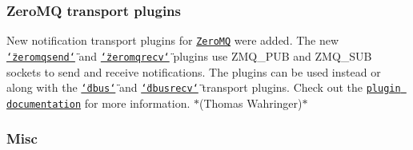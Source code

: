 \subsubsection*{Zero\+MQ transport plugins}


\begin{DoxyItemize}
\item New notification transport plugins for \href{http://zeromq.org/}{\tt Zero\+MQ} were added. The new \href{https://www.libelektra.org/plugins/zeromqsend}{\tt \char`\"{}zeromqsend\char`\"{}} and \href{https://www.libelektra.org/plugins/zeromqrecv}{\tt \char`\"{}zeromqrecv\char`\"{}} plugins use {\ttfamily Z\+M\+Q\+\_\+\+P\+UB} and {\ttfamily Z\+M\+Q\+\_\+\+S\+UB} sockets to send and receive notifications. The plugins can be used instead or along with the \href{https://www.libelektra.org/plugins/dbus}{\tt \char`\"{}dbus\char`\"{}} and \href{https://www.libelektra.org/plugins/dbusrecv}{\tt \char`\"{}dbusrecv\char`\"{}} transport plugins. Check out the \href{https://www.libelektra.org/plugins/zeromqrecv}{\tt plugin documentation} for more information. $\ast$(Thomas Wahringer)$\ast$
\end{DoxyItemize}

\subsubsection*{Misc}


